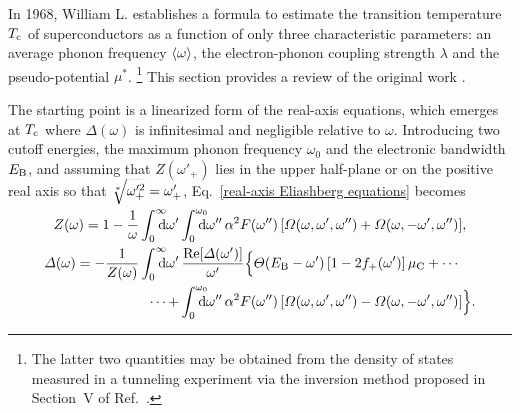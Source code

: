 In 1968, William L.  establishes a formula to estimate the
transition temperature $T \sb{\text{c}}$ of superconductors as a function of only three
characteristic parameters: an average phonon frequency $\langle\omega\rangle$, the
electron-phonon coupling strength $\lambda$ and the 
pseudo-potential $\mu^*$.%
%
\footnote{The latter two quantities may be obtained from the density of states
measured in a tunneling experiment via the inversion method proposed in
Section~V of Ref.~.}
%
This section provides a review of the original work \cite{McMillan68}.

The starting point is a linearized form of the real-axis 
equations, which emerges at $T \sb{\text{c}}$ where $\Delta(\omega)$ is infinitesimal
and negligible relative to $\omega$. Introducing two cutoff energies, the
maximum phonon frequency $\omega_0$ and the electronic bandwidth $E \sb{\text{B}}$, and
assuming that $Z(\omega'_+)$ lies in the upper half-plane or on the positive
real axis so that $\smash{\sqrt[\ast]{\omega'^2_+}} = \omega'_+$,
Eq.~\ref{real-axis Eliashberg equations} becomes
%
\begin{subequations} \label{linearized real-axis equations}
    \begin{align}
        Z(\omega) = 1 - \frac 1 \omega
        \int \from 0 \till \infty \D \omega'
        &\int \from 0 \till{\omega_0} \D \omega'' \, \alpha^2 F(\omega'') \,
        [ \Omega(\omega,  \omega', \omega'')
        + \Omega(\omega, -\omega', \omega'') ],
        \\
        \Delta(\omega) = -\frac 1 {Z(\omega)}
        \int \from 0 \till \infty \D \omega' \,
        \!&\,\frac{\Re[\Delta(\omega')]}{\omega'}
        \Big \{
            \Theta(E \sub B - \omega') \, [1 - 2 f_+(\omega')] \, \mu \sub C
            + \cdots
            \\
            \cdots +
            &\int \from 0 \till{\omega_0} \D \omega'' \, \alpha^2 F(\omega'') \,
            [ \Omega(\omega,  \omega', \omega'')
            - \Omega(\omega, -\omega', \omega'') ]
        \Big \}.
    \end{align}
\end{subequations}

